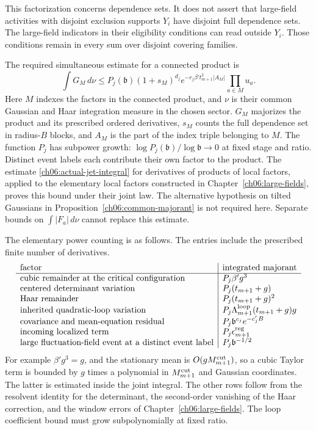 This factorization concerns dependence sets. It does not
assert that large-field activities with disjoint exclusion
supports $Y_i$ have disjoint full dependence sets.
The large-field indicators in their eligibility conditions can read outside $Y_i$.
Those conditions remain in every sum over disjoint covering families.

The required simultaneous estimate for a connected product is
\begin{equation}
 \int G_M\,d\nu\le
 P_j(\mathfrak b)(1+s_M)^{d_j}
       e^{-r_j\beta't_{m+1}^2|A_M|}
       \prod_{a\in M}u_a .
 \label{ch09:joint-input}
\end{equation}
Here $M$ indexes the factors in the connected product, and $\nu$ is their
common Gaussian and Haar integration measure in the chosen sector.
$G_M$ majorizes the product and its prescribed ordered
derivatives, $s_M$ counts the full dependence set in
radius-$B$ blocks, and $A_M$ is the part of the index triple belonging to $M$.
The function $P_j$ has subpower growth:
$\log P_j(\mathfrak b)/\log\mathfrak b\to0$ at fixed stage and
ratio. Distinct event labels each contribute their
own factor to the product. The estimate
\eqref{ch06:actual-jet-integral} for derivatives of products of local factors, applied to the elementary local factors
constructed in Chapter~\ref{ch06:large-fields}, proves this
bound under their joint law. The alternative hypothesis on tilted Gaussians
in Proposition~\ref{ch06:common-majorant} is not required here.
Separate bounds on $\int|F_a|\,d\nu$ cannot
replace this estimate.

The elementary power counting is as follows. The entries include
the prescribed finite number of derivatives.
\[
\begin{array}{l|l}
\text{factor}&\text{integrated majorant}\\ \hline
\text{cubic remainder at the critical configuration}&P_j\beta'g^3\\
\text{centered determinant variation}&P_j(t_{m+1}+g)\\
\text{Haar remainder}&P_j(t_{m+1}+g)^2\\
\text{inherited quadratic-loop variation}
   &P_j\Lambda_{m+1}^{\rm loop}(t_{m+1}+g)g\\
\text{covariance and mean-equation residual}
   &P_j\mathfrak b^{c_j}e^{-c'_jB}\\
\text{incoming localized term}&P_j\epsilon_{m+1}^{\rm reg}\\
\text{large fluctuation-field event at a distinct event label}&P_j\mathfrak b^{-1/2}
\end{array}
\]
For example $\beta'g^3=g$, and the stationary mean
is $O(gM_{m+1}^{\rm cut})$, so a cubic Taylor term is bounded
by $g$ times a polynomial in $M_{m+1}^{\rm cut}$ and Gaussian
coordinates. The latter is estimated inside the joint integral.
The other rows follow from the resolvent identity for the determinant,
the second-order vanishing of the Haar correction, and
the window errors of Chapter~\ref{ch06:large-fields}.
The loop coefficient bound must grow subpolynomially at fixed ratio.

